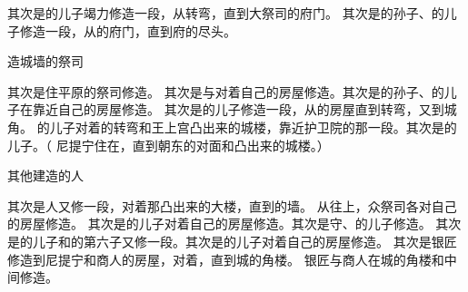 {其次是{}的儿子{}竭力修造一段，从{}转弯，直到大祭司{}的府门。
其次是{}的孙子、{}的儿子{}修造一段，从{}的府门，直到{}府的尽头。
\par }{\SH 造城墙的祭司
\par }{\PP {}其次是住平原的祭司修造。
其次是{}与{}对着自己的房屋修造。其次是{}的孙子、{}的儿子{}在靠近自己的房屋修造。
其次是{}的儿子{}修造一段，从{}的房屋直到{}转弯，又到城角。
的儿子{}{}对着{}的转弯和王上宫凸出来的城楼，靠近护卫院的那一段。其次是{}的儿子{}{}。（
尼提宁住在{}，直到朝东{}的对面和凸出来的城楼。）
\par }{\SH 其他建造的人
\par }{\PP {}其次是{}人又修一段，对着那凸出来的大楼，直到{}的墙。
从{}往上，众祭司各对自己的房屋修造。
其次是{}的儿子{}对着自己的房屋修造。其次是守{}、{}的儿子{}修造。
其次是{}的儿子{}和{}的第六子{}又修一段。其次是{}的儿子{}对着自己的房屋修造。
其次是银匠{}修造到尼提宁和商人的房屋，对着{}，直到城的角楼。
银匠与商人在城的角楼和{}中间修造。

}
